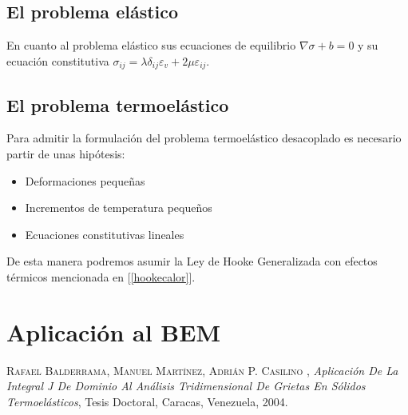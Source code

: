 \documentclass[11pt,a4paper]{article}
\begin{document}
\subsection{El problema elástico}
En cuanto al problema elástico sus ecuaciones de equilibrio $\nabla \sigma +b =0$ y su ecuación constitutiva $\sigma_{ij}=\lambda \delta_{ij} \varepsilon_{v} + 2 \mu \varepsilon_{ij}$.
\subsection{El problema termoelástico}
Para admitir la formulación del problema termoelástico desacoplado es necesario partir de unas hipótesis: \begin{itemize}
\item Deformaciones pequeñas
\item Incrementos de temperatura pequeños
\item Ecuaciones constitutivas lineales
\end{itemize}
De esta manera podremos asumir la Ley de Hooke Generalizada con efectos térmicos mencionada en [\ref{hookecalor}].
\section{Aplicación al BEM}
\cite{Bal}

\begin{thebibliography}{X}
 \textsc{Rafael Balderrama, Manuel Mart{\'\i}nez, Adri{\'a}n P. Casilino },
\textit{Aplicaci{\'o}n De La Integral J De Dominio Al An{\'a}lisis Tridimensional De Grietas En S{\'o}lidos Termoel{\'a}sticos}, Tesis Doctoral,
Caracas, Venezuela, 2004.
\end{thebibliography}
\end{document}
